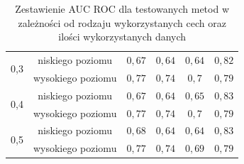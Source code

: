 \begin{table}[]
\begin{tabular}{|c|c|c|c|c|c|}
\multirow{2}{*}{0,3}   & niskiego poziomu  &  $ 0,67 $ & $ 0,64 $ & $ 0,64 $ &$ 0,82 $ \\ \cline{2-6} 
                       & wysokiego poziomu &  $ 0,77 $ & $ 0,74 $ & $ 0,7 $ &$ 0,79 $ \\ \hline
                       
\multirow{2}{*}{0,4}   & niskiego poziomu  & $ 0,67 $ & $ 0,64 $ & $ 0,65 $ &$ 0,83 $ \\ \cline{2-6} 
                       & wysokiego poziomu &  $ 0,77 $ & $ 0,74 $ & $ 0,7 $ &$ 0,79 $ \\ \hline
                       
\multirow{2}{*}{0,5}   & niskiego poziomu  &  $ 0,68 $ & $ 0,64 $ & $ 0,64 $ &$ 0,83 $ \\ \cline{2-6} 
                       & wysokiego poziomu &  $ 0,77 $ & $ 0,74 $ & $ 0,69 $ &$ 0,79 $ \\ \hline
\end{tabular}

\caption{Zestawienie AUC ROC dla testowanych metod w zależności od rodzaju wykorzystanych cech oraz ilości wykorzystanych danych}
\label{table:higgstable}

\end{table}


